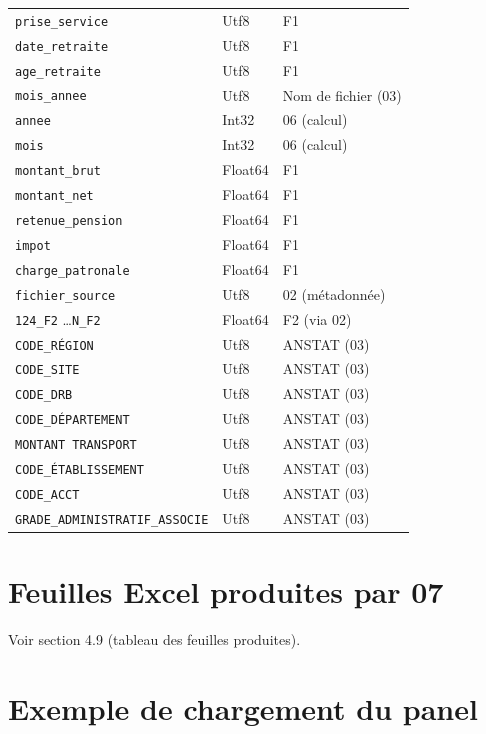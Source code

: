 \documentclass[12pt,a4paper,french]{report}
\begin{document}
\begin{longtable}{lll}
  \texttt{prise\_service} & Utf8 & F1 \\
  \texttt{date\_retraite} & Utf8 & F1 \\
  \texttt{age\_retraite} & Utf8 & F1 \\
  \texttt{mois\_annee} & Utf8 & Nom de fichier (03) \\
  \texttt{annee} & Int32 & 06 (calcul) \\
  \texttt{mois} & Int32 & 06 (calcul) \\
  \texttt{montant\_brut} & Float64 & F1 \\
  \texttt{montant\_net} & Float64 & F1 \\
  \texttt{retenue\_pension} & Float64 & F1 \\
  \texttt{impot} & Float64 & F1 \\
  \texttt{charge\_patronale} & Float64 & F1 \\
  \texttt{fichier\_source} & Utf8 & 02 (métadonnée) \\
  \texttt{124\_F2} \ldots \texttt{N\_F2} & Float64 & F2 (via 02) \\
  \texttt{CODE\_RÉGION} & Utf8 & ANSTAT (03) \\
  \texttt{CODE\_SITE} & Utf8 & ANSTAT (03) \\
  \texttt{CODE\_DRB} & Utf8 & ANSTAT (03) \\
  \texttt{CODE\_DÉPARTEMENT} & Utf8 & ANSTAT (03) \\
  \texttt{MONTANT TRANSPORT} & Utf8 & ANSTAT (03) \\
  \texttt{CODE\_ÉTABLISSEMENT} & Utf8 & ANSTAT (03) \\
  \texttt{CODE\_ACCT} & Utf8 & ANSTAT (03) \\
  \texttt{GRADE\_ADMINISTRATIF\_ASSOCIE} & Utf8 & ANSTAT (03) \\
  \bottomrule
\end{longtable}

\section{Feuilles Excel produites par 07}

Voir section 4.9 (tableau des feuilles produites).

\section{Exemple de chargement du panel}
\end{document}
